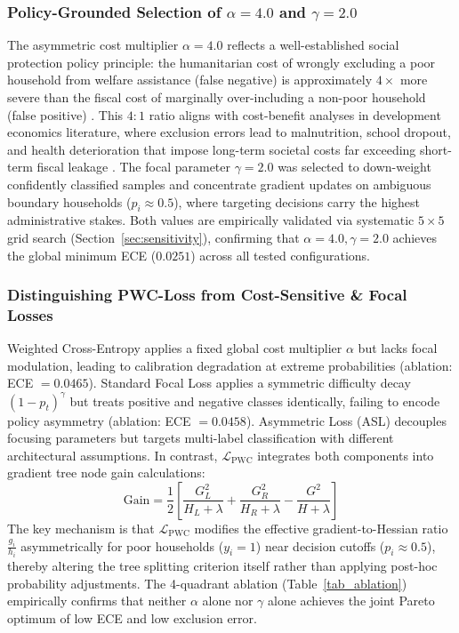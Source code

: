 \documentclass[conference]{IEEEtran}
\begin{document}
\subsubsection{Policy-Grounded Selection of $\alpha=4.0$ and $\gamma=2.0$}
The asymmetric cost multiplier $\alpha=4.0$ reflects a well-established social protection policy principle: the humanitarian cost of wrongly excluding a poor household from welfare assistance (false negative) is approximately $4\times$ more severe than the fiscal cost of marginally over-including a non-poor household (false positive) \cite{b4, b23}. This $4{:}1$ ratio aligns with cost-benefit analyses in development economics literature, where exclusion errors lead to malnutrition, school dropout, and health deterioration that impose long-term societal costs far exceeding short-term fiscal leakage \cite{b2, b11}. The focal parameter $\gamma=2.0$ was selected to down-weight confidently classified samples and concentrate gradient updates on ambiguous boundary households ($p_i \approx 0.5$), where targeting decisions carry the highest administrative stakes. Both values are empirically validated via systematic $5 \times 5$ grid search (Section~\ref{sec:sensitivity}), confirming that $\alpha=4.0, \gamma=2.0$ achieves the global minimum ECE ($0.0251$) across all tested configurations.

\subsubsection{Distinguishing PWC-Loss from Cost-Sensitive \& Focal Losses}
Weighted Cross-Entropy applies a fixed global cost multiplier $\alpha$ but lacks focal modulation, leading to calibration degradation at extreme probabilities (ablation: ECE $=0.0465$). Standard Focal Loss \cite{b_focal} applies a symmetric difficulty decay $(1-p_t)^\gamma$ but treats positive and negative classes identically, failing to encode policy asymmetry (ablation: ECE $=0.0458$). Asymmetric Loss (ASL) \cite{b_asl} decouples focusing parameters but targets multi-label classification with different architectural assumptions. In contrast, $\mathcal{L}_{\text{PWC}}$ integrates both components into gradient tree node gain calculations:
\begin{equation}
\text{Gain} = \frac{1}{2} \left[ \frac{G_L^2}{H_L + \lambda} + \frac{G_R^2}{H_R + \lambda} - \frac{G^2}{H + \lambda} \right]
\end{equation}
The key mechanism is that $\mathcal{L}_{\text{PWC}}$ modifies the effective gradient-to-Hessian ratio $\frac{g_i}{h_i}$ asymmetrically for poor households ($y_i=1$) near decision cutoffs ($p_i \approx 0.5$), thereby altering the tree splitting criterion itself rather than applying post-hoc probability adjustments. The 4-quadrant ablation (Table~\ref{tab_ablation}) empirically confirms that neither $\alpha$ alone nor $\gamma$ alone achieves the joint Pareto optimum of low ECE and low exclusion error.
\end{document}
